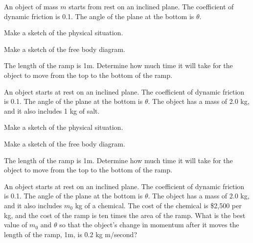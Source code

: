 
\begin{problem}
\item An object of mass $m$ starts from rest on an inclined plane. The
  coefficient of dynamic friction is 0.1. The angle of the plane at
  the bottom is $\theta$.
  \begin{subproblem}
  \item Make a sketch of the physical situation.
    \vfill
  \item Make a sketch of the free body diagram.
    \vfill
  \item The length of the ramp is 1m. Determine how much time it will
    take for the object to move from the top to the bottom of the
    ramp.
    \vfill
  \end{subproblem}
\end{problem}


\begin{problem}
\item An object starts at rest on an inclined plane. The coefficient
  of dynamic friction is 0.1. The angle of the plane at the bottom is
  $\theta$. The object has a mass of 2.0 kg, and it also includes 1 kg
  of salt.
  \begin{subproblem}
  \item Make a sketch of the physical situation.  
    \vfill
  \item Make a sketch of the free body diagram.
    \vfill
    \clearpage
  \item The length of the ramp is 1m. Determine how much time it will
    take for the object to move from the top to the bottom of the
    ramp.  
    \vfill
  \end{subproblem}
\end{problem}

\begin{problem}
\item An object starts at rest on an inclined plane. The coefficient
  of dynamic friction is 0.1. The angle of the plane at the bottom is
  $\theta$. The object has a mass of 2.0 kg, and it also includes
  $m_0$ kg of a chemical. The cost of the chemical is \$2,500 per kg,
  and the cost of the ramp is ten times the area of the ramp. What is
  the best value of $m_0$ and $\theta$ so that the object's change in
  momentum after it moves the length of the ramp, 1m, is 0.2 kg
  m/second?

  \vfill

\end{problem}

